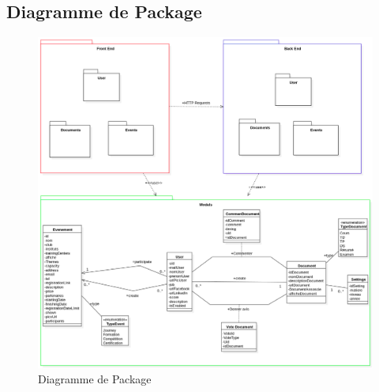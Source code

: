 \documentclass[12pt]{report}
\begin{document}
\begin{landscape}
\section{Diagramme de Package}
\begin{figure}[hbtp]
    \centering
    \includegraphics[width=.8\textwidth]{Diagramme de Package}
    \caption{Diagramme de Package}
    \label{fig:diag package}
\end{figure}
\restoregeometry
\end{landscape}
\end{document}
